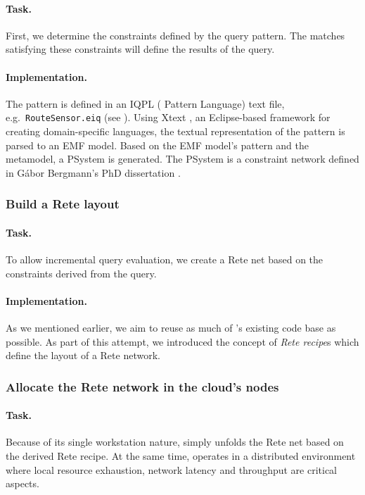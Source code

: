 \paragraph{Task.} First, we determine the constraints defined by the query pattern. The matches satisfying these constraints will define the results of the query.

\paragraph{Implementation.} The pattern is defined in an IQPL (\iq{} Pattern Language) text file, e.g.\ \texttt{RouteSensor.eiq} (see ). Using Xtext \cite{Xtext}, an Eclipse-based framework for creating domain-specific languages, the textual representation of the pattern is parsed to an EMF model. Based on the EMF model's pattern and the metamodel, a PSystem is generated. The PSystem is a constraint network defined in Gábor Bergmann's PhD dissertation \cite{PSystem}. 

\subsubsection{Build a Rete layout}

\paragraph{Task.} To allow incremental query evaluation, we create a Rete net based on the constraints derived from the query.

\paragraph{Implementation.} As we mentioned earlier, we aim to reuse as much of \eiq{}'s existing code base as possible. As part of this attempt, we introduced the concept of \textit{Rete recipe}s which define the layout of a Rete network.    

\subsubsection{Allocate the Rete network in the cloud's nodes} 

\paragraph{Task.} Because of its single workstation nature, \eiq{} simply unfolds the Rete net based on the derived Rete recipe. At the same time, \iqd{} operates in a distributed environment where local resource exhaustion, network latency and throughput are critical aspects. 

